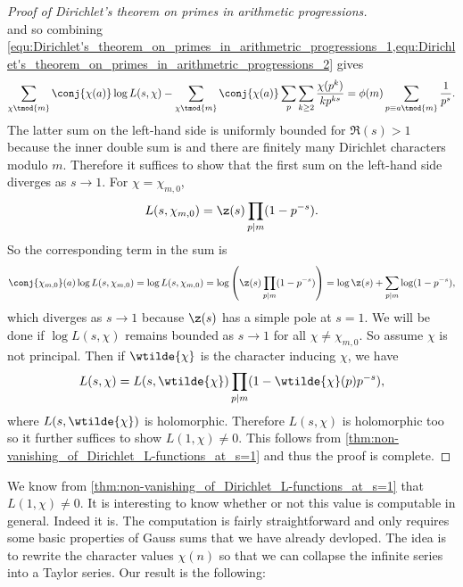 \begin{proof}[Proof of Dirichlet's theorem on primes in arithmetic progressions]
\begin{equation}
          \end{equation}
          and so combining \cref{equ:Dirichlet's_theorem_on_primes_in_arithmetric_progressions_1,equ:Dirichlet's_theorem_on_primes_in_arithmetric_progressions_2} gives
          \[
            \sum_{\chi \tmod{m}}\conj{\chi(a)}\log L(s,\chi)-\sum_{\chi \tmod{m}}\conj{\chi(a)}\sum_{p}\sum_{k \ge 2}\frac{\chi(p^{k})}{kp^{ks}} = \phi(m)\sum_{p \equiv{a} \tmod{m}}\frac{1}{p^{s}}.
          \]
          The latter sum on the left-hand side is uniformly bounded for $\Re(s) > 1$ because the inner double sum is and there are finitely many Dirichlet characters modulo $m$. Therefore it suffices to show that the first sum on the left-hand side diverges as $s \to 1$. For $\chi = \chi_{m,0}$,
          \[
            L(s,\chi_{m,0}) = \z(s)\prod_{p \mid m}(1-p^{-s}).
          \]
          So the corresponding term in the sum is
          \[
            \conj{\chi_{m,0}}(a)\log L(s,\chi_{m,0}) = \log L(s,\chi_{m,0}) = \log\left(\z(s)\prod_{p \mid m}(1-p^{-s})\right) = \log\z(s)+\sum_{p \mid m}\log(1-p^{-s}),
          \]
          which diverges as $s \to 1$ because $\z(s)$ has a simple pole at $s = 1$. We will be done if $\log L(s,\chi)$ remains bounded as $s \to 1$ for all $\chi \neq \chi_{m,0}$. So assume $\chi$ is not principal. Then if $\wtilde{\chi}$ is the character inducing $\chi$, we have
          \[
            L(s,\chi) = L(s,\wtilde{\chi})\prod_{p \mid m}(1-\wtilde{\chi}(p)p^{-s}),
          \]
          where $L(s,\wtilde{\chi})$ is holomorphic. Therefore $L(s,\chi)$ is holomorphic too so it further suffices to show $L(1,\chi) \neq 0$. This follows from \cref{thm:non-vanishing_of_Dirichlet_L-functions_at_s=1} and thus the proof is complete.
      \end{proof}

      We know from \cref{thm:non-vanishing_of_Dirichlet_L-functions_at_s=1} that $L(1,\chi) \neq 0$. It is interesting to know whether or not this value is computable in general. Indeed it is. The computation is fairly straightforward and only requires some basic properties of Gauss sums that we have already devloped. The idea is to rewrite the character values $\chi(n)$ so that we can collapse the infinite series into a Taylor series. Our result is the following:
      
